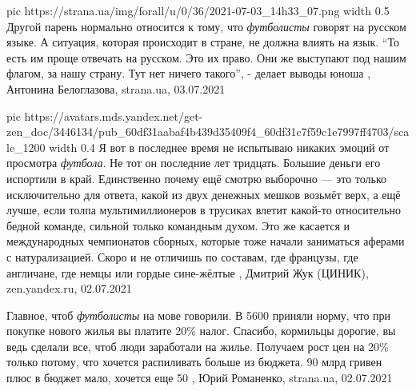 \ifcmt
  pic https://strana.ua/img/forall/u/0/36/2021-07-03_14h33_07.png
	width 0.5
\fi
Другой парень нормально относится к тому, что \emph{футболисты} говорят на русском
языке. А ситуация, которая происходит в стране, не должна влиять на язык. 
\enquote{То есть им проще отвечать на русском. Это их право. Они же выступают под нашим
флагом, за нашу страну. Тут нет ничего такого}, - делает выводы юноша
, 
Антонина Белоглазова, strana.ua, 03.07.2021

\ifcmt
  pic https://avatars.mds.yandex.net/get-zen_doc/3446134/pub_60df31aabaf4b439d35409f4_60df31c7f59c1e7997ff4703/scale_1200
	width 0.4
\fi
Я вот в последнее время не испытываю никаких эмоций от просмотра \emph{футбола}. Не
тот он последние лет тридцать. Большие деньги его испортили в край. Единственно
почему ещё смотрю выборочно — это только исключительно для ответа, какой из
двух денежных мешков возьмёт верх, а ещё лучше, если толпа мультимиллионеров в
трусиках влетит какой-то относительно бедной команде, сильной только командным
духом. Это же касается и международных чемпионатов сборных, которые тоже начали
заниматься аферами с натурализацией. Скоро и не отличишь по составам, где
французы, где англичане, где немцы или гордые сине-жёлтые
, Дмитрий Жук (ЦИНИК), zen.yandex.ru, 02.07.2021

Главное, чтоб \emph{футболисты} на мове говорили.
В 5600 приняли норму, что при покупке нового жилья вы платите 20\% налог.
Спасибо, кормильцы дорогие, вы ведь сделали все, чтоб люди заработали на жилье.
Получаем рост цен на 20\% только потому, что хочется распиливать больше из
бюджета. 90 млрд гривен плюс в бюджет мало, хочется еще 50
, 
Юрий Романенко, strana.ua, 02.07.2021
